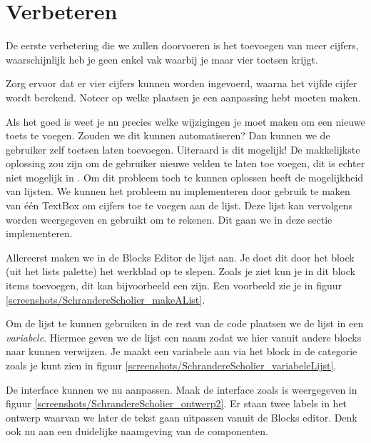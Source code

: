 \section{Verbeteren}
De eerste verbetering die we zullen doorvoeren is het toevoegen van meer cijfers, waarschijnlijk heb je geen enkel vak waarbij je maar vier toetsen krijgt. 

 \begin{opgave}
    \opgVraag
Zorg ervoor dat er vier cijfers kunnen worden ingevoerd, waarna het vijfde cijfer wordt berekend. Noteer op welke plaatsen je een aanpassing hebt moeten maken.
\end{opgave}

Als het goed is weet je nu precies welke wijzigingen je moet maken om een nieuwe toets te voegen. Zouden we dit kunnen automatiseren? Dan kunnen we de gebruiker zelf toetsen laten toevoegen. Uiteraard is dit mogelijk! De makkelijkste oplossing zou zijn om de gebruiker nieuwe velden te laten toe voegen, dit is echter niet mogelijk in \ai. Om dit probleem toch te kunnen oplossen heeft \ai de mogelijkheid van lijsten. We kunnen het probleem nu implementeren door gebruik te maken van \'e\'en TextBox om cijfers toe te voegen aan de lijst. Deze lijst kan vervolgens worden weergegeven en gebruikt om te rekenen. Dit gaan we in deze sectie implementeren.

Allereerst maken we in de Blocks Editor de lijst aan. Je doet dit door het  block (uit het lists palette) het werkblad op te slepen. Zoals je ziet kun je in dit block items toevoegen, dit kan bijvoorbeeld een  zijn. Een voorbeeld zie je in figuur \ref{screenshots/SchrandereScholier_makeAList}.

Om de lijst te kunnen gebruiken in de rest van de code plaatsen we de lijst in een \emph{variabele}. Hiermee geven we de lijst een naam zodat we hier vanuit andere blocks naar kunnen verwijzen. Je maakt een variabele aan via het  block in de categorie  zoals je kunt zien in figuur \ref{screenshots/SchrandereScholier_variabeleLijst}. 

 \begin{opgave}
    \opgVraag
De interface kunnen we nu aanpassen. Maak de interface zoals is weergegeven in figuur \ref{screenshots/SchrandereScholier_ontwerp2}. Er staan twee labels in het ontwerp waarvan we later de tekst gaan uitpassen vanuit de Blocks editor. Denk ook nu aan een duidelijke naamgeving van de componenten.
\end{opgave}


